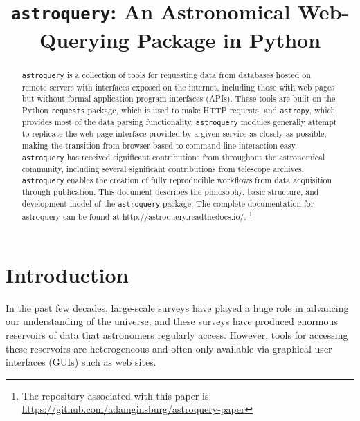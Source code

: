 \documentclass[twocolumn]{aastex62}
\newcommand{\package}[1]{\texttt{#1}\xspace}
\newcommand{\astroquery}{\package{astroquery}}
\newcommand{\astropypkg}{\package{astropy}}
\begin{document}


\title{\astroquery: An Astronomical Web-Querying Package in Python}

\begin{abstract}
\astroquery is a collection of tools for requesting data from databases hosted
on remote servers with interfaces exposed on the internet, including those with
web pages but without formal application program interfaces (APIs).  These
tools are built on the Python
\package{requests} package,
which is used to make HTTP requests, and
\astropypkg, which provides most of the data parsing functionality.
\astroquery modules generally attempt to replicate the web page interface
provided by a given service as closely as possible, making the transition
from browser-based to command-line interaction easy.
\astroquery
has received significant contributions from throughout the astronomical community,
including several significant contributions from telescope archives.
\astroquery enables the creation of fully reproducible workflows from data
acquisition through publication.  This document describes the philosophy, basic
structure, and development model of the \astroquery package.
The complete documentation for astroquery can be found at
\url{http://astroquery.readthedocs.io/}.
\footnote{%
The repository associated with this paper is:\\
\url{https://github.com/adamginsburg/astroquery-paper}
}
\end{abstract}


\section{Introduction}
In the past few decades, large-scale surveys have played a huge role in
advancing our understanding of the universe, and these surveys have produced
enormous reservoirs of data that astronomers regularly access.  However, tools
for accessing these reservoirs are heterogeneous and often only available via
graphical user interfaces (GUIs) such as web sites.
\end{document}
